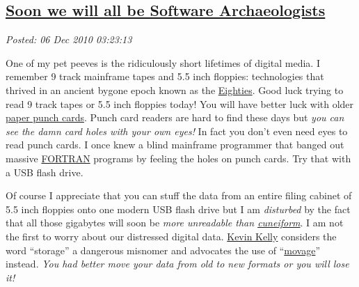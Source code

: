 %

\subsection*{\href{https://bakerjd99.wordpress.com/2010/12/06/soon-we-will-all-be-software-archeologists/}{Soon we will all be Software Archaeologists}}


\noindent\emph{Posted: 06 Dec 2010 03:23:13}
\vspace{6pt}

One of my pet peeves is the ridiculously short lifetimes of digital
media. I remember 9 track mainframe tapes and 5.5 inch floppies:
technologies that thrived in an ancient bygone epoch known as the
\href{http://www.google.com/images?hl=en\&q=the+eighties\&um=1\&ie=UTF-8\&source=univ\&ei=LrgCTfL1A4fEnAesmuTlDQ\&sa=X\&oi=image\_result\_group\&ct=title\&resnum=1\&ved=0CCkQsAQwAA\&biw=888\&bih=495}{Eighties}.
Good luck trying to read 9 track tapes or 5.5 inch floppies today! You
will have better luck with older
\href{http://www.computerhistory.org/collections/accession/102688725}{paper
punch cards}. Punch card readers are hard to find these days but
\emph{you can see the damn card holes with your own eyes!} In fact you
don't even need eyes to read punch cards. I once knew a blind mainframe
programmer that banged out massive
\href{http://en.wikipedia.org/wiki/Fortran}{FORTRAN} programs by feeling
the holes on punch cards. Try that with a USB flash drive.

Of course I appreciate that you can stuff the data from an entire filing
cabinet of 5.5 inch floppies onto one modern USB flash drive but I am
\emph{disturbed} by the fact that all those gigabytes will soon be
\emph{more unreadable than
\href{http://en.wikipedia.org/wiki/Cuneiform\_script}{cuneiform}}. I am
not the first to worry about our distressed digital data.
\href{http://kk.org/}{Kevin Kelly} considers the word ``storage'' a
dangerous misnomer and advocates the use of
``\href{http://www.kk.org/thetechnium/archives/2008/12/movage.php}{movage}''
instead. \emph{You had better move your data from old to new formats or
you will lose it!}


